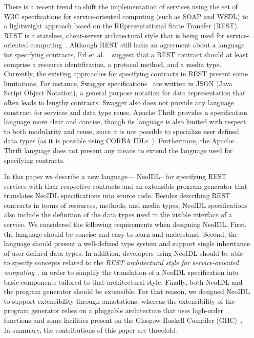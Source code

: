 \documentclass{ws-ijseke}
\newcommand{\neoidl}{NeoIDL}
\begin{document}
There is a recent trend to shift the implementation of services using the set of
W3C specifications for service-oriented 
computing (such as SOAP and WSDL) to a lightweight
approach based on the REpresentational State Transfer (REST). REST is
a stateless, client-server architectural style that is being used for
service-oriented computing~\cite{fielding-rest:2002}. Although REST still lacks an agreement about a language for specifying
contracts, Erl et al. ~\cite{erl2012soa} suggest
that a REST contract should at least
comprise a resource identification, a
protocol method, and a media type.
Currently, the existing approaches for specifying
contracts in REST present some limitations. For instance, 
Swagger specifications~\cite{swagger} are written in  JSON (Java
Script Object Notation), a general purpose notation for data
representation that often leads to lengthy contracts. 
Swagger also does not provide any language construct for 
services and data type reuse. Apache Thrift provides a specification language more clear and
concise, though its language is also limited with respect to both modularity and
reuse, since it is not possible to specialize user defined data types (as it is possible using CORBA IDLs~\cite{corba}). Furthermore, 
the Apache Thrift language does not present any means to extend the
language used for specifying contracts. 

In this paper we 
describe a new language--- \neoidl-- for specifying REST services
with their respective contracts and an
extensible program generator that translates \neoidl{} specifications into
source code. Besides describing REST contracts in terms of resources,
methods, and media types, \neoidl{} specifications also include the
definition of the data types used in the visible interface of a service. 
We considered the following requirements when designing \neoidl.
First, the language should be concise and easy to learn and
understand.
Second, the language should present a well-defined type system
and support single inheritance of user defined data types. In
addition, developers using \neoidl{} should be able to specify
concepts related to the \emph{REST architectural style for service-oriented
  computing}~\cite{fielding-rest:2002}, in order to simplify the translation of a \neoidl{}
specification into basic components tailored to that architectural style. Finally,
both \neoidl{} and the program generator should be extensible. For
that reason, we designed \neoidl{} to support extensibility 
through annotations;
whereas the extensibility of the program generator relies on a
pluggable architecture that uses high-order functions and 
some facilities present on the Glasgow Haskell Compiler (GHC)~\cite{ghc-api}. 
In summary, the contributions of this paper are threefold.
\end{document}
